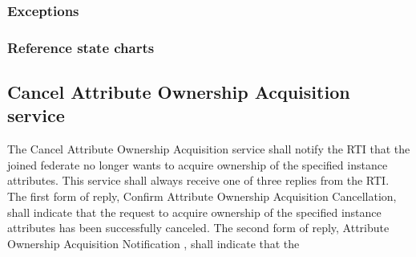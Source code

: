 \begin{compactstdpage}
    \subsubsection{Exceptions}



    \subsubsection{Reference state charts}



    \subsection{Cancel Attribute Ownership Acquisition service}


    The Cancel Attribute Ownership Acquisition service shall notify the RTI that the joined federate no longer wants to acquire ownership of the specified instance attributes. This service shall always receive one of three replies from the RTI. The first form of reply, Confirm Attribute Ownership Acquisition Cancellation, shall indicate that the request to acquire ownership of the specified instance attributes has been successfully canceled. The second form of reply, Attribute Ownership Acquisition Notification \rtiinitiated{}, shall indicate that the

\end{compactstdpage}

\clearpage

